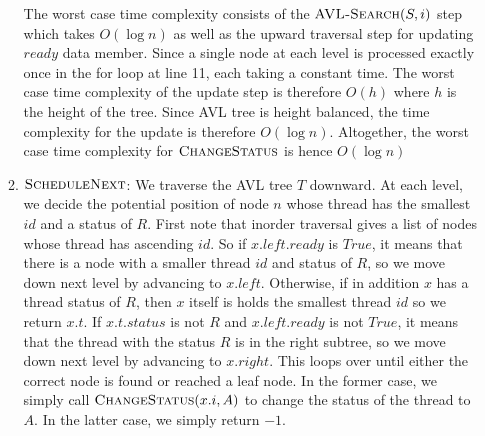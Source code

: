 \documentclass[11pt]{article}
\begin{document}
\begin{enumerate}
\begin{enumerate}
    \begin{algorithm}[H]
      \caption{$ $}

    \end{algorithm}
    The worst case time complexity consists of the $\textsc{AVL-Search}(S, i)$ step which takes $O(\log n)$ as well as the upward traversal step for updating $ready$ data member. Since a single node at each level is processed exactly once in the for loop at line 11, each taking a constant time. The worst case time complexity of the update step is therefore $O(h)$ where $h$ is the height of the tree. Since AVL tree is height balanced, the time complexity for the update is therefore $O(\log n)$. Altogether, the worst case time complexity for $\textsc{ChangeStatus}$ is hence $O(\log n)$
    \item $\textsc{ScheduleNext}$: We traverse the AVL tree $T$ downward. At each level, we decide the potential position of node $n$ whose thread has the smallest $id$ and a status of $R$. First note that inorder traversal gives a list of nodes whose thread has ascending $id$. So if $x.left.ready$ is $True$, it means that there is a node with a smaller thread $id$ and status of $R$, so we move down next level by advancing to $x.left$. Otherwise, if in addition $x$ has a thread status of $R$, then $x$ itself is holds the smallest thread $id$ so we return $x.t$. If $x.t.status$ is not $R$ and $x.left.ready$ is not $True$, it means that the thread with the status $R$ is in the right subtree, so we move down next level by advancing to $x.right$. This loops over until either the correct node is found or reached a leaf node. In the former case, we simply call $\textsc{ChangeStatus}(x.i, A)$ to change the status of the thread to $A$. In the latter case, we simply return $-1$.


\end{enumerate}
\end{enumerate}
\end{document}
